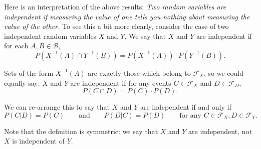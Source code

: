 \documentclass[a4paper,12pt]{scrreprt}
\theoremstyle{definition}
\theoremstyle{plain}
\theoremstyle{remark}
\begin{document}
Here is an interpretation of the above results: \emph{Two random variables are independent if measuring the value of one tells you nothing about measuring the value of the other.} To see this a bit more clearly, consider the case of two independent random variables $X$ and $Y$. We say that $X$ and $Y$ are independent if for each $A, B \in \mathcal{B}$,
\begin{equation*}
  P\left( X^{-1}(A) \cap Y^{-1}(B) \right) = P\left( X^{-1}(A) \right)\cdot P\left( Y^{-1}(B) \right).
\end{equation*}

Sets of the form $X^{-1}(A)$ are exactly those which belong to $\mathcal{F}_{X}$, so we could equally say: $X$ and $Y$ are independent if for any events $C \in \mathcal{F}_{X}$ and $D \in \mathcal{F}_{D}$,
\begin{equation*}
  P(C \cap D) = P(C)\cdot P(D).
\end{equation*}

We can re-arrange this to say that $X$ and $Y$ are independent if and only if
\begin{equation*}
  P(C | D) = P(C)\qquad\text{and}\qquad P(D |C) = P(D)\qquad\text{for any }C \in \mathcal{F}_{X}, D \in \mathcal{F}_{Y}.
\end{equation*}

Note that the definition is symmetric: we say that $X$ and $Y$ are independent, not $X$ is independent of $Y$.
\end{document}
